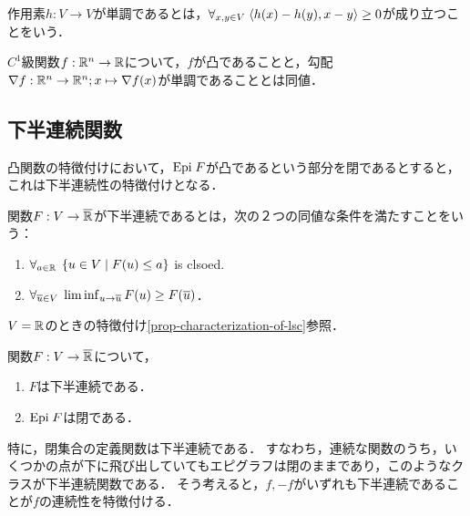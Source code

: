 \documentclass[uplatex,dvipdfmx]{jsreport}
\begin{document}
\begin{definition}
    作用素$h:V\to V$が単調であるとは，$\forall_{x,y\in V}\;\langle h(x)-h(y),x-y\rangle\ge0$が成り立つことをいう．
\end{definition}

\begin{proposition}
    $C^1$級関数$f:\mathbb{R}^n\to\mathbb{R}$について，$f$が凸であることと，勾配$\nabla f:\mathbb{R}^n\to\mathbb{R}^n;x\mapsto\nabla f(x)$が単調であることとは同値．
\end{proposition}

\subsection{下半連続関数}

\begin{tcolorbox}[colframe=ForestGreen, colback=ForestGreen!10!white,breakable,colbacktitle=ForestGreen!40!white,coltitle=black,fonttitle=\bfseries\sffamily,
title=]
    凸関数の特徴付けにおいて，$\mathrm{Epi}\; F$が凸であるという部分を閉であるとすると，これは下半連続性の特徴付けとなる．
\end{tcolorbox}

\begin{definition}
    関数$F:V\to\overline{\mathbb{R}}$が下半連続であるとは，次の２つの同値な条件を満たすことをいう：
    \begin{enumerate}
        \item $\forall_{a\in\mathbb{R}}\;\left\{u\in V\mid F(u)\le a\right\}$ is clsoed.
        \item $\forall_{\overline{u}\in V}\;\liminf_{u\to\overline{u}}F(u)\ge F(\overline{u})$．
    \end{enumerate}
    $V=\mathbb{R}$のときの特徴付け\ref{prop-characterization-of-lsc}参照．
\end{definition}

\begin{proposition}[下半連続関数の特徴付け]
    関数$F:V\to\overline{\mathbb{R}}$について，
    \begin{enumerate}
        \item $F$は下半連続である．
        \item $\mathrm{Epi}\; F$は閉である．
    \end{enumerate}
\end{proposition}
\begin{remarks}
    特に，閉集合の定義関数は下半連続である．
    すなわち，連続な関数のうち，いくつかの点が下に飛び出していてもエピグラフは閉のままであり，このようなクラスが下半連続関数である．
    そう考えると，$f,-f$がいずれも下半連続であることが$f$の連続性を特徴付ける．
\end{remarks}
\end{document}
